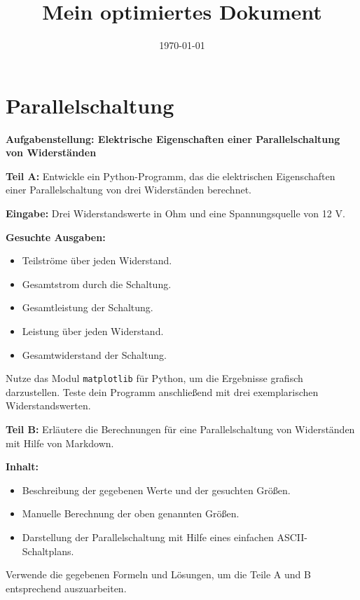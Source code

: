\documentclass[12pt,a4paper]{scrartcl}
\title{Mein optimiertes Dokument}
\date{\today}
\newcommand{\tightlist}{
  \setlength{\itemsep}{0pt}\setlength{\parskip}{0pt}
}
\begin{document}
\maketitle

\hypertarget{parallelschaltung}{%
\section{Parallelschaltung}\label{parallelschaltung}}

\textbf{Aufgabenstellung: Elektrische Eigenschaften einer
Parallelschaltung von Widerständen}

\textbf{Teil A:} Entwickle ein Python-Programm, das die elektrischen
Eigenschaften einer Parallelschaltung von drei Widerständen berechnet.

\textbf{Eingabe:} Drei Widerstandswerte in Ohm und eine Spannungsquelle
von 12 V.

\textbf{Gesuchte Ausgaben:}

\begin{itemize}
\tightlist
\item
  Teilströme über jeden Widerstand.
\item
  Gesamtstrom durch die Schaltung.
\item
  Gesamtleistung der Schaltung.
\item
  Leistung über jeden Widerstand.
\item
  Gesamtwiderstand der Schaltung.
\end{itemize}

Nutze das Modul {\lstinline!matplotlib!} für Python, um die
Ergebnisse grafisch darzustellen. Teste dein Programm anschließend mit
drei exemplarischen Widerstandswerten.

\textbf{Teil B:} Erläutere die Berechnungen für eine Parallelschaltung
von Widerständen mit Hilfe von Markdown.

\textbf{Inhalt:}

\begin{itemize}
\tightlist
\item
  Beschreibung der gegebenen Werte und der gesuchten Größen.
\item
  Manuelle Berechnung der oben genannten Größen.
\item
  Darstellung der Parallelschaltung mit Hilfe eines einfachen
  ASCII-Schaltplans.
\end{itemize}

Verwende die gegebenen Formeln und Lösungen, um die Teile A und B
entsprechend auszuarbeiten.
\end{document}
